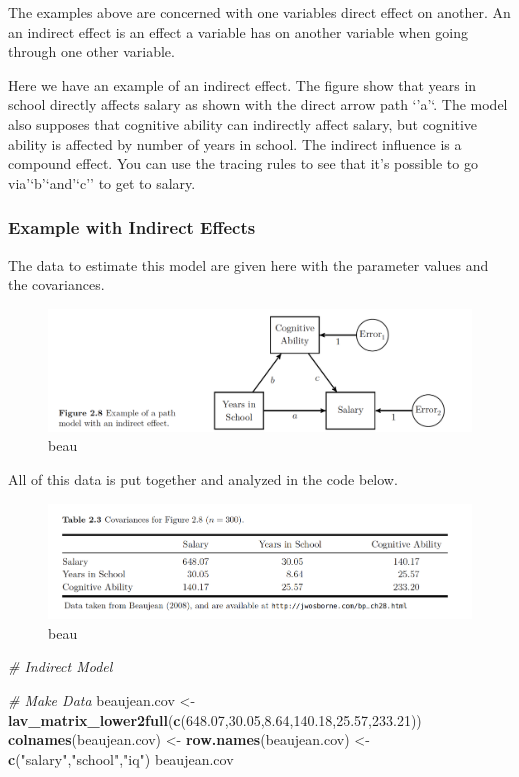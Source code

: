 \documentclass[]{book}
\newenvironment{Shaded}{\begin{snugshade}}{\end{snugshade}}
\newcommand{\KeywordTok}[1]{\textcolor[rgb]{0.13,0.29,0.53}{\textbf{#1}}}
\newcommand{\FloatTok}[1]{\textcolor[rgb]{0.00,0.00,0.81}{#1}}
\newcommand{\StringTok}[1]{\textcolor[rgb]{0.31,0.60,0.02}{#1}}
\newcommand{\CommentTok}[1]{\textcolor[rgb]{0.56,0.35,0.01}{\textit{#1}}}
\newcommand{\NormalTok}[1]{#1}
\theoremstyle{definition}
\theoremstyle{definition}
\theoremstyle{definition}
\theoremstyle{remark}
\begin{document}
The examples above are concerned with one variables direct effect on
another. An an indirect effect is an effect a variable has on another
variable when going through one other variable.

Here we have an example of an indirect effect. The figure show that
years in school directly affects salary as shown with the direct arrow
path `'a'`. The model also supposes that cognitive ability can
indirectly affect salary, but cognitive ability is affected by number of
years in school. The indirect influence is a compound effect. You can
use the tracing rules to see that it's possible to go via'`b'`and'`c''
to get to salary.

\subsubsection{Example with Indirect
Effects}\label{example-with-indirect-effects}

The data to estimate this model are given here with the parameter values
and the covariances.

\begin{figure}
\centering
\includegraphics{img/beaupath5.png}
\caption{beau}
\end{figure}

All of this data is put together and analyzed in the code below.

\begin{figure}
\centering
\includegraphics{img/beaupath6.png}
\caption{beau}
\end{figure}

\begin{Shaded}
\begin{Highlighting}[]
\CommentTok{# Indirect Model }

\CommentTok{# Make Data}
\NormalTok{beaujean.cov <-}\StringTok{ }\KeywordTok{lav_matrix_lower2full}\NormalTok{(}\KeywordTok{c}\NormalTok{(}\FloatTok{648.07}\NormalTok{,}\FloatTok{30.05}\NormalTok{,}\FloatTok{8.64}\NormalTok{,}\FloatTok{140.18}\NormalTok{,}\FloatTok{25.57}\NormalTok{,}\FloatTok{233.21}\NormalTok{))}
\KeywordTok{colnames}\NormalTok{(beaujean.cov) <-}\StringTok{ }\KeywordTok{row.names}\NormalTok{(beaujean.cov) <-}\StringTok{ }\KeywordTok{c}\NormalTok{(}\StringTok{"salary"}\NormalTok{,}\StringTok{"school"}\NormalTok{,}\StringTok{"iq"}\NormalTok{)}
\NormalTok{beaujean.cov}
\end{Highlighting}
\end{Shaded}
\end{document}
